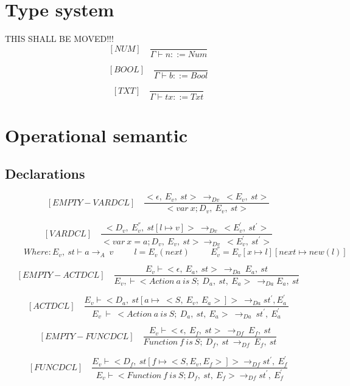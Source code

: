   \section{Type system}
  THIS SHALL BE MOVED!!!
	\[
	[NUM] \quad
	\dfrac{}{\Gamma \vdash n ::= Num}
	\]
	 
	\[
	[BOOL] \quad
	\dfrac{}{\Gamma \vdash b ::= Bool}
	\]
	
  	\[
  	[TXT] \quad
  	\dfrac{}{\Gamma \vdash tx ::= Txt}
  	\]
  	
  \section{Operational semantic}
  
  \subsection{Declarations}
  	\[
	[EMPTY-VARDCL] \quad
	\dfrac{<\epsilon, \ E_v, \ st> \ \rightarrow_{Dv} \ <E_v, \ st> }{<var \ x; D_v,\ E_v,\ st>}
	\]
    	
   	\[
   	[VARDCL] \quad
   	\dfrac{<D_v, \ E_v^{''}, \ st[l \mapsto v]> \ \rightarrow_{Dv} \ <E_v^{'}, \ st^{'}> }{<var \ x = a; D_v,\ E_v,\ st> \rightarrow_{Dv} \ <E_v^{'}, \ st^{'}>}
   	\]
   	\begin{math}
 	  	\qquad \ Where: E_v, \ st \vdash a \rightarrow_A \ v
 	  	\qquad \ \ l = E_v(next)
 	  	\qquad \ \ E_v^{''} = E_v[x \mapsto l][next \mapsto new(l)]
   	\end{math}
    	
   	\[
   	[EMPTY-ACTDCL] \quad
   	\dfrac{E_v \vdash <\epsilon, \ E_a, \ st> \ \rightarrow_{Da} \ E_a, \ st}{ E_v, \vdash  <Action \ a \ is \ S; \ D_a, \ st, \ E_a> \ \rightarrow_{Da} E_a, \ st }
   	\]
    	
    	
  	\[
   	[ACTDCL] \quad
   	\dfrac{E_v \vdash <D_a, \ st[a \mapsto \ <S, \ E_v, \ E_a>]>   \ \rightarrow_{Da} st^{'}, E_a^{'} \ }{E_v \ \vdash \ <Action \ a \ is \ S; \ D_a, \ st, \ E_a> \ \rightarrow_{Da} \ st^{'}, \ E_a^{'}}
   	\]
    	
   	\[
   	[EMPTY-FUNCDCL] \quad
   	\dfrac{E_v \vdash < \epsilon, \ E_f, \ st> \ \rightarrow_{Df} \ E_f, \ st}{Function \ f \ is \ S; \ D_f, \ st \ \rightarrow_{Df} \ E_f, \ st}
   	\]
   	
   	\[
   	[FUNCDCL] \quad
   	\dfrac{E_v \vdash <D_f, \ st[f \mapsto <S, E_v, E_f>]> \rightarrow_{Df} st^{'}, \ E_f^{'}}{E_v \vdash <Function \ f \ is \ S; D_f, \ st, \ E_f > \rightarrow_{Df} st^{'}, \ E_f^{'}}
   	\]
   	
